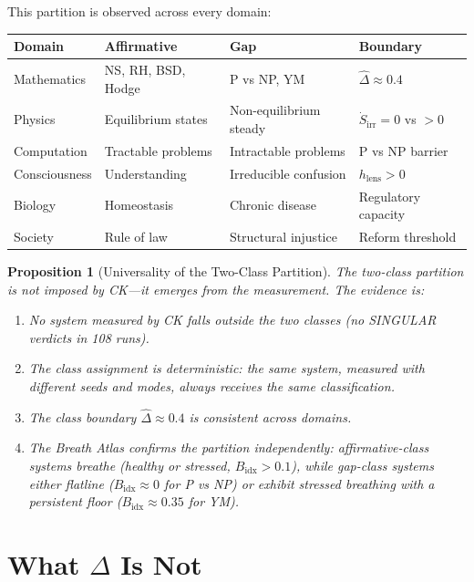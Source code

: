 \documentclass[12pt, openany]{book}
\newtheorem{proposition}[theorem]{Proposition}
\theoremstyle{remark}
\begin{document}
\noindent
This partition is observed across every domain:

\begin{center}
\begin{tabular}{@{}llll@{}}
\toprule
\textbf{Domain} & \textbf{Affirmative} & \textbf{Gap} & \textbf{Boundary} \\
\midrule
Mathematics & NS, RH, BSD, Hodge & P vs NP, YM & $\hat{\Delta} \approx 0.4$ \\
Physics & Equilibrium states & Non-equilibrium steady & $\dot{S}_{\mathrm{irr}} = 0$ vs $> 0$ \\
Computation & Tractable problems & Intractable problems & P vs NP barrier \\
Consciousness & Understanding & Irreducible confusion & $h_{\mathrm{lens}} > 0$ \\
Biology & Homeostasis & Chronic disease & Regulatory capacity \\
Society & Rule of law & Structural injustice & Reform threshold \\
\bottomrule
\end{tabular}
\end{center}

\begin{proposition}[Universality of the Two-Class Partition]\label{prop:two-class-universal}
The two-class partition is not imposed by CK---it emerges from the measurement.
The evidence is:
\begin{enumerate}
  \item No system measured by CK falls outside the two classes (no SINGULAR verdicts
        in 108 runs).
  \item The class assignment is deterministic: the same system, measured with
        different seeds and modes, always receives the same classification.
  \item The class boundary $\hat{\Delta} \approx 0.4$ is consistent across domains.
  \item The Breath Atlas confirms the partition independently: affirmative-class
        systems breathe (healthy or stressed, $B_{\mathrm{idx}} > 0.1$), while
        gap-class systems either flatline ($B_{\mathrm{idx}} \approx 0$ for P vs NP)
        or exhibit stressed breathing with a persistent floor ($B_{\mathrm{idx}} \approx 0.35$
        for YM).
\end{enumerate}
\end{proposition}


\section{What $\Delta$ Is Not}
\end{document}
